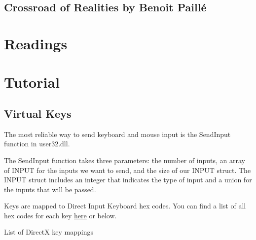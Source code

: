 \documentclass[
  openany]{book}
\begin{document}
\hypertarget{crossroad-of-realities-by-benoit-pailluxe9}{%
\subsection*{Crossroad of Realities by Benoit Paillé}\label{crossroad-of-realities-by-benoit-pailluxe9}}

\hypertarget{readings-7}{%
\section*{Readings}\label{readings-7}}

\hypertarget{tutorial-7}{%
\section*{Tutorial}\label{tutorial-7}}

\hypertarget{virtual-keys}{%
\subsection*{Virtual Keys}\label{virtual-keys}}

The most reliable way to send keyboard and mouse input is the SendInput function in user32.dll.

The SendInput function takes three parameters: the number of inputs, an array of INPUT for the inputs we want to send, and the size of our INPUT struct. The INPUT struct includes an integer that indicates the type of input and a union for the inputs that will be passed.

Keys are mapped to Direct Input Keyboard hex codes. You can find a list of all hex codes for each key \href{http://www.flint.jp/misc/?q=dik\&lang=en}{here} or below.

List of DirectX key mappings
\end{document}
